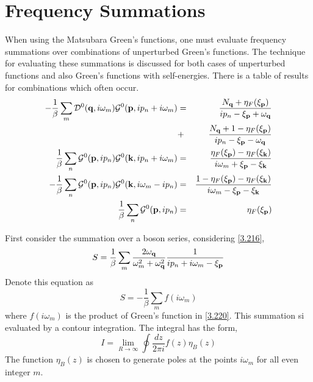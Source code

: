 \section{Frequency Summations}
When using the Matsubara Green's functions, one must evaluate frequency summations over combinations of unperturbed Green's functions.
The technique for evaluating these summations is discussed for both cases of unperturbed functions and also Green's functions with self-energies.
There is a table of results for combinations which often occur.
\begin{eqnarray}
  -\frac{1}{\beta} \sum_m \mathcal{D}^0(\mathbf{q},i\omega_m)\mathcal{G}^0(\mathbf{p},ip_n+i\omega_m) &=& \frac{N_{\mathbf{q}} + \eta_F(\xi_{\mathbf{p}})}{ip_n-\xi_{\mathbf{p}}+\omega_{\mathbf{q}}} \nonumber \\
  &+& \frac{N_{\mathbf{q}} + 1 - \eta_F(\xi_{\mathbf{p}})}{ip_n -\xi_{\mathbf{p}}-\omega_{\mathbf{q}}} \label{3.216} \\
  \frac{1}{\beta} \sum_n \mathcal{G}^0(\mathbf{p},ip_n) \mathcal{G}^0(\mathbf{k},ip_n+i\omega_m) &=& \frac{\eta_F(\xi_{\mathbf{p}})-\eta_F(\xi_{\mathbf{k}})}{i\omega_m + \xi_{\mathbf{p}} -\xi_{\mathbf{k}}} \label{3.217} \\
  -\frac{1}{\beta} \sum_n \mathcal{G}^0(\mathbf{p},ip_n) \mathcal{G}^0(\mathbf{k},i\omega_m-ip_n) &=& \frac{1-\eta_F(\xi_{\mathbf{p}}) - \eta_F(\xi_{\mathbf{k}})}{i\omega_m -\xi_{\mathbf{p}} -\xi_{\mathbf{k}}} \label{3.218}\\
  \frac{1}{\beta} \sum_n \mathcal{G}^0(\mathbf{p},ip_n) &=& \eta_F(\xi_{\mathbf{p}})\label{3.219}
\end{eqnarray}

First consider the summation over a boson series, considering \eqref{3.216},
\begin{equation}
  S = \frac{1}{\beta} \sum_m \frac{2\omega_{\mathbf{q}}}{\omega_m^2+\omega_{\mathbf{q}}^2} \frac{1}{ip_n+i\omega_m -\xi_{\mathbf{p}}} \label{3.220}
\end{equation}
Denote this equation as
\begin{equation}
  S = -\frac{1}{\beta} \sum_m f(i\omega_m) \label{3.221}
\end{equation}
where $f(i\omega_m)$ is the product of Green's function in \eqref{3.220}. This summation si evaluated by a contour integration. The integral has the form,
\begin{equation}
  I = \lim_{R\to \infty} \oint \frac{dz}{2\pi i} f(z) \eta_B(z)  \label{3.222}
\end{equation}
The function $\eta_B(z)$ is chosen to generate poles at the points $i\omega_m$ for all even integer $m$.
